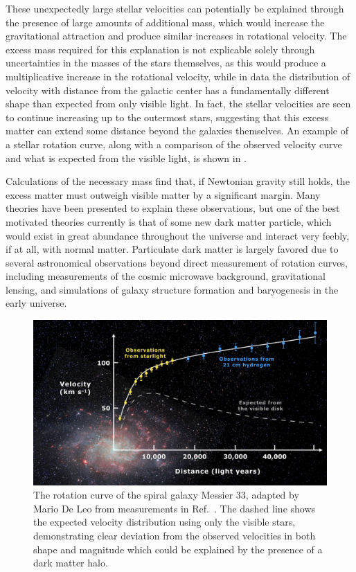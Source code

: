 These unexpectedly large stellar velocities can potentially be explained through the presence of large amounts of additional mass, which would increase the gravitational attraction and produce similar increases in rotational velocity. 
The excess mass required for this explanation is not explicable solely through uncertainties in the masses of the stars themselves, as this would produce a multiplicative increase in the rotational velocity, while in data the distribution of velocity with distance from the galactic center has a fundamentally different shape than expected from only visible light.
In fact, the stellar velocities are seen to continue increasing up to the outermost stars, suggesting that this excess matter can extend some distance beyond the galaxies themselves. 
An example of a stellar rotation curve, along with a comparison of the observed velocity curve and what is expected from the visible light, is shown in .

Calculations of the necessary mass find that, if Newtonian gravity still holds, the excess matter must outweigh visible matter by a significant margin. 
Many theories have been presented to explain these observations, but one of the best motivated theories currently is that of some new dark matter particle, which would exist in great abundance throughout the universe and interact very feebly, if at all, with normal matter.
Particulate dark matter is largely favored due to several astronomical observations beyond direct measurement of rotation curves, including measurements of the cosmic microwave background, gravitational lensing, and simulations of galaxy structure formation and baryogenesis in the early universe.

\begin{figure}
   \centering
   \includegraphics[width=\textwidth]{figures/rotation_curve.png}
   \caption[Rotation curve of Messier 33]{The rotation curve of the spiral galaxy Messier 33, adapted by Mario De Leo from measurements in Ref.~\cite{Corbelli}. The dashed line shows the expected velocity distribution using only the visible stars, demonstrating clear deviation from the observed velocities in both shape and magnitude which could be explained by the presence of a dark matter halo.}
   \label{fig:rotCurve}	
\end{figure}

